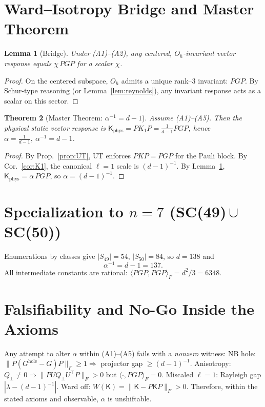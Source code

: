 \documentclass[11pt]{article}
\newtheorem{theorem}{Theorem}
\newtheorem{lemma}[theorem]{Lemma}
\theoremstyle{definition}
\newcommand{\1}{\mathbf{1}}
\begin{document}
\section{Ward–Isotropy Bridge and Master Theorem}
\begin{lemma}[Bridge]
\label{lem:bridge}
Under (A1)–(A2), any centered, \(O_h\)-invariant vector response equals \(\chi\,PGP\) for a scalar \(\chi\).
\end{lemma}
\begin{proof}
On the centered subspace, \(O_h\) admits a unique rank–3 invariant: \(PGP\). By Schur-type reasoning (or Lemma~\ref{lem:reynolds}), any invariant response acts as a scalar on this sector.
\end{proof}

\begin{theorem}[Master Theorem: $\alpha^{-1}=d-1$]
\label{thm:master}
Assume (A1)–(A5). Then the physical static vector response is
\(
\mathsf{K}_{\!\mathrm{phys}}=PK_1P=\frac{1}{d-1}PGP
\),
hence \(
\alpha=\frac{1}{d-1},\ \alpha^{-1}=d-1
\).
\end{theorem}
\begin{proof}
By Prop.~\ref{prop:UT}, UT enforces \(PKP=PGP\) for the Pauli block. By Cor.~\ref{cor:K1}, the canonical \(\ell=1\) scale is \((d-1)^{-1}\). By Lemma~\ref{lem:bridge}, \(\mathsf{K}_{\!\mathrm{phys}}=\alpha\,PGP\), so \(\alpha=(d-1)^{-1}\).
\end{proof}

\section{Specialization to $n=7$ (SC(49)\,$\cup$\,SC(50))}
Enumerations by classes give \(|S_{49}|=54\), \(|S_{50}|=84\), so \(d=138\) and
\[
\boxed{\ \alpha^{-1}=d-1=137.\ }
\]
All intermediate constants are rational: \(\langle PGP,PGP\rangle_F=d^2/3=6348\).

\section{Falsifiability and No-Go Inside the Axioms}
Any attempt to alter \(\alpha\) within (A1)–(A5) fails with a \emph{nonzero} witness:
NB hole: \(\|P(G^{\mathrm{hole}}-G)P\|_F\ge 1\Rightarrow\) projector gap \(\ge (d-1)^{-1}\).
Anisotropy: \(Q_\perp\neq 0\Rightarrow\|PUQ_\perp U^\top P\|_F>0\) but \(\langle\cdot,PGP\rangle_F=0\).
Miscaled \(\ell=1\): Rayleigh gap \(|\lambda-(d-1)^{-1}|\).
Ward off: \(W(\mathsf{K})=\|\mathsf{K}-P\mathsf{K}P\|_F>0\).
Therefore, within the stated axioms and observable, \(\alpha\) is unshiftable.
\end{document}

